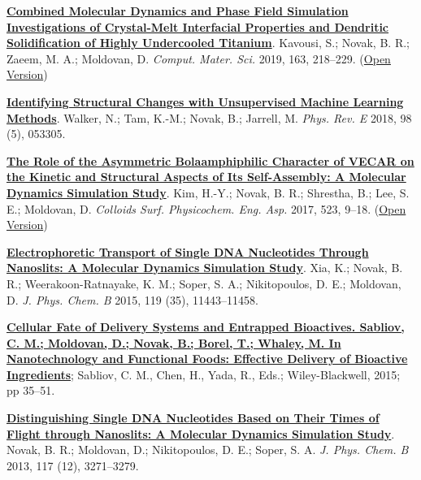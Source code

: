 \begin{cventries}
{\begin{cvitems}
        \item {\href{https://doi.org/10.1016/j.commatsci.2019.03.024}{\textbf{Combined Molecular Dynamics and Phase Field Simulation Investigations of Crystal-Melt Interfacial Properties and Dendritic Solidification of Highly Undercooled Titanium}}. Kavousi, S.; Novak, B. R.; Zaeem, M. A.; Moldovan, D. \textit{Comput. Mater. Sci.} 2019, 163, 218–229. (\href{https://ipfs.io/ipfs/QmTY7FGs5p6zrExjUZ5bBpLohWdkmvvgtXZj1JuF9vV8Ay?filename=Combined_molecular_dynamics_and_phase_field_simulation_investigations_of_crystal-melt_interfacial_properties_and_dendritic_solidification_of_highly_undercooled_titanium.pdf}{Open Version})}
       \item {\href{https://doi.org/10.1103/PhysRevE.98.053305}{\textbf{Identifying Structural Changes with Unsupervised Machine Learning Methods}}. Walker, N.; Tam, K.-M.; Novak, B.; Jarrell, M. \textit{Phys. Rev. E} 2018, 98 (5), 053305.}
        \item {\href{https://doi.org/10.1016/j.colsurfa.2017.03.060}{\textbf{The Role of the Asymmetric Bolaamphiphilic Character of VECAR on the Kinetic and Structural Aspects of Its Self-Assembly: A Molecular Dynamics Simulation Study}}. Kim, H.-Y.; Novak, B. R.; Shrestha, B.; Lee, S. E.; Moldovan, D. \textit{Colloids Surf. Physicochem. Eng. Asp.} 2017, 523, 9–18. (\href{https://www.sciencedirect.com/science/article/am/pii/S0927775717303205}{Open Version})}
        \item {\href{https://doi.org/10.1021/acs.jpcb.5b02798}{\textbf{Electrophoretic Transport of Single DNA Nucleotides Through Nanoslits: A Molecular Dynamics Simulation Study}}. Xia, K.; Novak, B. R.; Weerakoon-Ratnayake, K. M.; Soper, S. A.; Nikitopoulos, D. E.; Moldovan, D. \textit{J. Phys. Chem. B} 2015, 119 (35), 11443–11458. }
        \item {\href{https://onlinelibrary.wiley.com/doi/pdf/10.1002/9781118462157#page=47}{\textbf{Cellular Fate of Delivery Systems and Entrapped Bioactives. Sabliov, C. M.; Moldovan, D.; Novak, B.; Borel, T.; Whaley, M. In Nanotechnology and Functional Foods: Effective Delivery of Bioactive Ingredients}}; Sabliov, C. M., Chen, H., Yada, R., Eds.; Wiley-Blackwell, 2015; pp 35–51.}
        \item {\href{https://doi.org/10.1021/jp309486c}{\textbf{Distinguishing Single DNA Nucleotides Based on Their Times of Flight through Nanoslits: A Molecular Dynamics Simulation Study}}. Novak, B. R.; Moldovan, D.; Nikitopoulos, D. E.; Soper, S. A. \textit{J. Phys. Chem. B} 2013, 117 (12), 3271–3279. }

\end{cvitems}}
\end{cventries}
